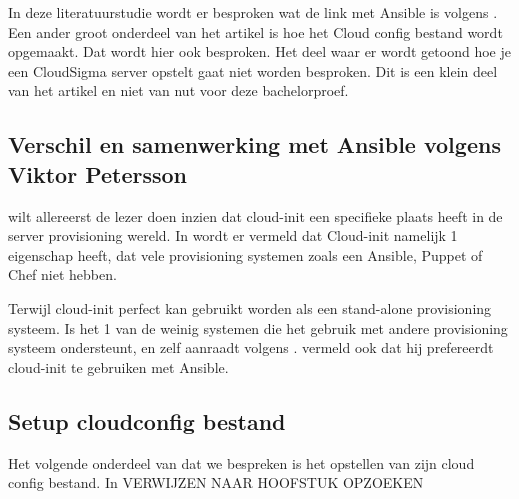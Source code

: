 In deze literatuurstudie wordt er besproken wat de link met Ansible is volgens \autocite{viktorpet}. Een ander groot onderdeel van het artikel is hoe het Cloud config bestand wordt opgemaakt. Dat wordt hier ook besproken. Het deel waar er wordt getoond hoe je een CloudSigma server opstelt gaat niet worden besproken. Dit is een klein deel van het artikel en niet van nut voor deze bachelorproef.

\subsection{Verschil en samenwerking met Ansible volgens Viktor Petersson}
\autocite{viktorpet} wilt allereerst de lezer doen inzien dat cloud-init een specifieke plaats heeft in de server provisioning wereld. In \autocite{viktorpet} wordt er vermeld dat Cloud-init namelijk 1 eigenschap heeft, dat vele provisioning systemen zoals een Ansible, Puppet of Chef niet hebben. 

Terwijl cloud-init perfect kan gebruikt worden als een stand-alone provisioning systeem. Is het 1 van de weinig systemen die het gebruik met andere provisioning systeem ondersteunt, en zelf aanraadt volgens \autocite{viktorpet}. \autocite{viktorpet} vermeld ook dat hij prefereerdt cloud-init te gebruiken met Ansible.

\subsection{Setup cloudconfig bestand}
Het volgende onderdeel van \autocite{viktorpet} dat we bespreken is het opstellen van zijn cloud config bestand. In VERWIJZEN NAAR HOOFSTUK OPZOEKEN
